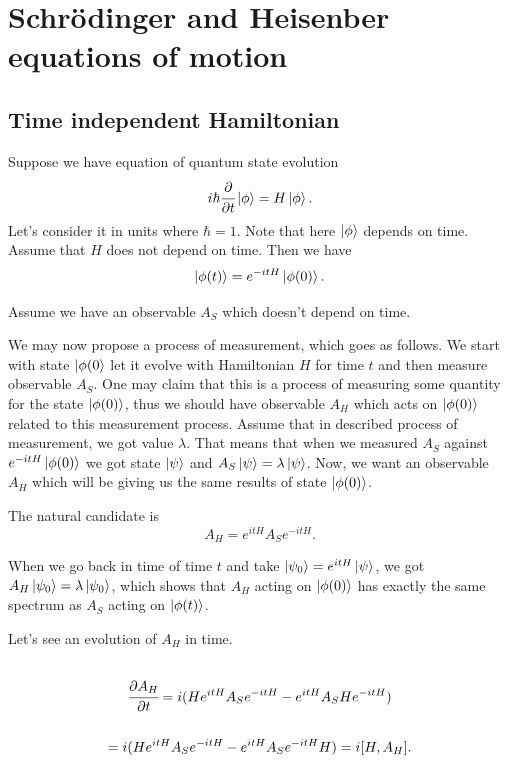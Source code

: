 \documentclass[main.tex]{subfiles}
\begin{document}
\section{Schrödinger and Heisenber equations of motion}

\subsection{Time independent Hamiltonian}

Suppose we have equation of quantum state evolution
\begin{equation}
i\hbar\cfrac{\partial}{\partial t} \ket{\phi} = H\ket{\phi}.
\end{equation}
Let's consider it in units where $\hbar = 1$. Note that here $\ket{\phi}$ depends on time. Assume that $H$ does not depend on time.
Then we have
\begin{equation}
\ket{\phi(t)} = e^{-itH}\ket{\phi(0)}.
\end{equation}

Assume we have an observable $A_S$ which doesn't depend on time.

We may now propose a process of measurement, which goes as follows. We start with state $\ket{\phi(0}$ let it evolve with Hamiltonian $H$ for time $t$ and then measure observable $A_S$. One may claim that this is a process of measuring some quantity for the state $\ket{\phi(0)}$, thus we should have observable $A_H$ which acts on $\ket{\phi(0)}$ related to this measurement process. Assume that in described process of measurement, we got value $\lambda$. That means that when we measured $A_S$ against 
$e^{-itH}\ket{\phi(0)}$ we got state $\ket{\psi}$ and $A_S \ket{\psi} = \lambda \ket{\psi}$. Now, we want an observable $A_H$ which will be giving us the same results of state $\ket{\phi(0)}$.

The natural candidate is 
\begin{equation}
\label{magic-heisenberg}
A_H = e^{itH} A_S e^{-itH}.
\end{equation}

When we go back in time of time $t$ and take $\ket{\psi_0} = e^{itH} \ket{\psi}$, we got $A_H \ket{\psi_0} = \lambda \ket{\psi_0}$, which shows that $A_H$ acting on $\ket{\phi(0)}$ has exactly the same spectrum as $A_S$ acting on $\ket{\phi(t)}$.

Let's see an evolution of $A_H$ in time.
\begin{multline*}
\\
\cfrac{\partial A_H}{\partial t} = i(H e^{itH} A_S e^{-itH} - e^{itH} A_S He^{-itH})\\
\\ = i(H e^{itH} A_S e^{-itH} - e^{itH} A_S e^{-itH}H) = i[H,A_H].
\\
\end{multline*}
\end{document}
